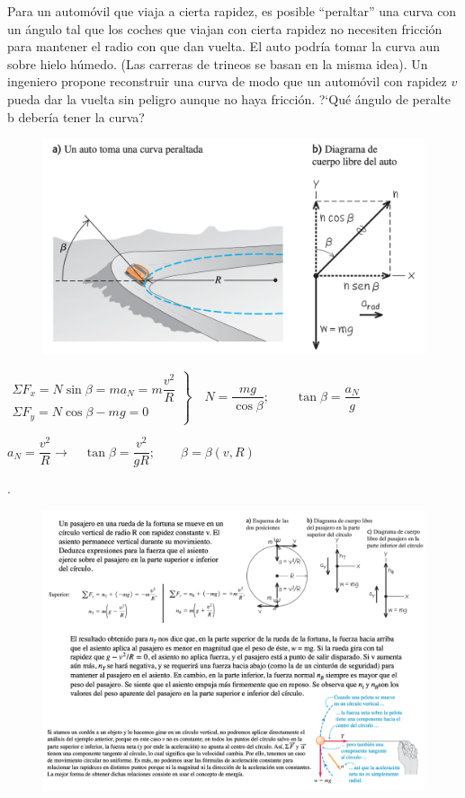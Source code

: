  \begin{prob}
 Para un automóvil que viaja a cierta rapidez, es posible ``peraltar'' una curva con un ángulo tal que los coches que viajan con cierta rapidez no necesiten fricción para mantener el radio con que dan vuelta. El auto podría tomar la curva aun sobre hielo húmedo. (Las carreras de trineos se basan en la misma idea). Un ingeniero propone reconstruir una curva de modo que un automóvil con rapidez $v$ pueda dar la vuelta sin peligro aunque no haya fricción. ?`Qué ángulo de peralte b debería tener la curva?	
 \end{prob}
 \vspace{-5mm}%
\begin{figure}[H]
	\centering
	\includegraphics[width=.9\textwidth]{imagenes/imagenes03/T03IM45.png}
	\end{figure}
 
 
 $\left. \begin{array}{ll}
\Sigma F_x= N\sin \beta=m a_N = m \dfrac {v^2}{R} \\ \Sigma F_y=N\cos \beta-mg=0
 \end{array}\right\} \quad N=\dfrac{mg}{\cos \beta};\qquad \tan \beta=\dfrac{a_N}{g}$
 
 $a_N=\dfrac {v^2}{R} \to \quad \tan \beta = \dfrac {v^2}{gR};\qquad \beta=\beta(v,R)$
 

 \begin{prob}.
 \begin{figure}[H]
	\centering
	\includegraphics[width=1\textwidth]{imagenes/imagenes03/T03IM46.png}
	\end{figure}
 \end{prob}
 

